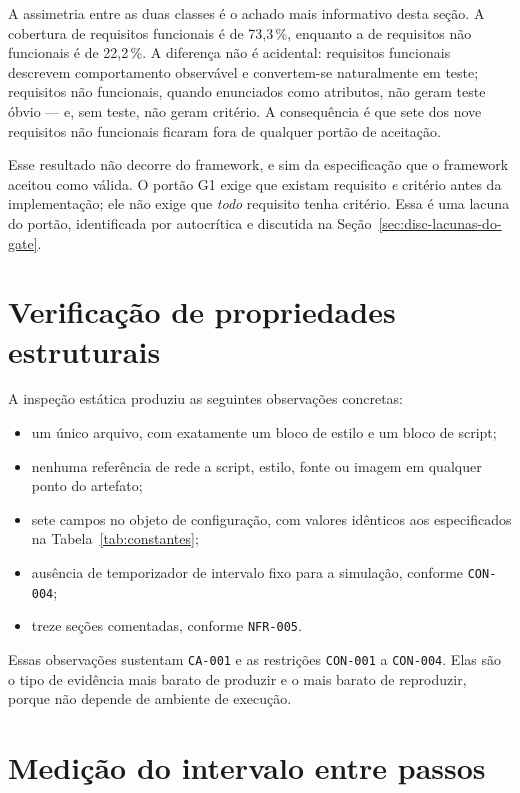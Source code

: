 A assimetria entre as duas classes é o achado mais informativo desta seção. A
cobertura de requisitos funcionais é de 73,3\,\%, enquanto a de requisitos não
funcionais é de 22,2\,\%. A diferença não é acidental: requisitos funcionais
descrevem comportamento observável e convertem-se naturalmente em teste;
requisitos não funcionais, quando enunciados como atributos, não geram teste
óbvio --- e, sem teste, não geram critério. A consequência é que sete dos nove
requisitos não funcionais ficaram fora de qualquer portão de aceitação.

Esse resultado não decorre do framework, e sim da especificação que o framework
aceitou como válida. O portão G1 exige que existam requisito \emph{e} critério
antes da implementação; ele não exige que \emph{todo} requisito tenha critério.
Essa é uma lacuna do portão, identificada por autocrítica e discutida na
Seção~\ref{sec:disc-lacunas-do-gate}.

\section{Verificação de propriedades estruturais}
\label{sec:res-estruturais}

A inspeção estática produziu as seguintes observações concretas:

\begin{itemize}
	\item um único arquivo, com exatamente um bloco de estilo e um bloco de script;
	\item nenhuma referência de rede a script, estilo, fonte ou imagem em qualquer ponto do artefato;
	\item sete campos no objeto de configuração, com valores idênticos aos especificados na Tabela~\ref{tab:constantes};
	\item ausência de temporizador de intervalo fixo para a simulação, conforme \texttt{CON-004};
	\item treze seções comentadas, conforme \texttt{NFR-005}.
\end{itemize}

Essas observações sustentam \texttt{CA-001} e as restrições \texttt{CON-001} a
\texttt{CON-004}. Elas são o tipo de evidência mais barato de produzir e o mais
barato de reproduzir, porque não depende de ambiente de execução.

\section{Medição do intervalo entre passos}
\label{sec:res-velocidade}

